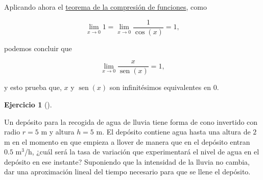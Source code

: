 \documentclass[
  spanish,
  a4paper,
]{scrreport}
\theoremstyle{definition}
\newtheorem{exercise}{Ejercicio}[chapter]
\theoremstyle{remark}
\begin{document}
\begin{tcolorbox}
Aplicando ahora el
\href{https://aprendeconalf.es/analisis-manual/06-limites.html\#thm-compresi\%C3\%B3n-funciones}{teorema
de la compresión de funciones}, como

\[
\lim_{x\to 0} 1 = \lim_{x\to 0} \frac{1}{\cos(x)} = 1,
\]

podemos concluir que

\[
\lim_{x\to 0} \frac{x}{\operatorname{sen}(x)} = 1,
\]

y esto prueba que, \(x\) y \(\operatorname{sen}(x)\) son infinitésimos
equivalentes en \(0\).

\end{tcolorbox}

\begin{exercise}[]\protect\hypertarget{exr-5}{}\label{exr-5}

Un depósito para la recogida de agua de lluvia tiene forma de cono
invertido con radio \(r=5\) m y altura \(h=5\) m. El depósito contiene
agua hasta una altura de \(2\) m en el momento en que empieza a llover
de manera que en el depósito entran \(0.5\) m\(^3\)/h, ¿cuál será la
tasa de variación que experimentará el nivel de agua en el depósito en
ese instante? Suponiendo que la intensidad de la lluvia no cambia, dar
una aproximación lineal del tiempo necesario para que se llene el
depósito.

\end{exercise}
\end{document}
